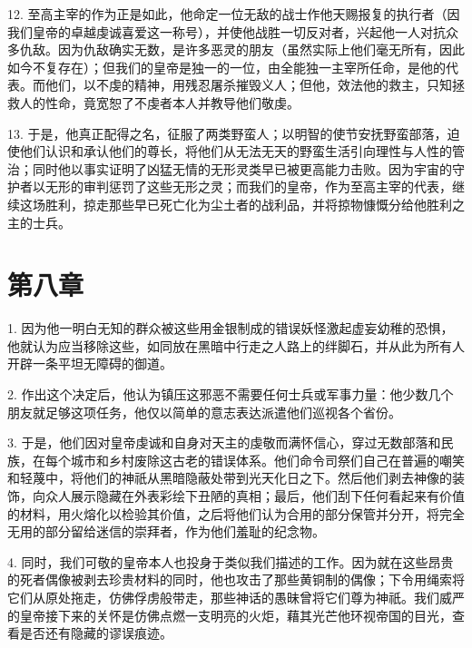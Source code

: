 12. 至高主宰的作为正是如此，他命定一位无敌的战士作他天赐报复的执行者（因我们皇帝的卓越虔诚喜爱这一称号），并使他战胜一切反对者，兴起他一人对抗众多仇敌。因为仇敌确实无数，是许多恶灵的朋友（虽然实际上他们毫无所有，因此如今不复存在）；但我们的皇帝是独一的一位，由全能独一主宰所任命，是他的代表。而他们，以不虔的精神，用残忍屠杀摧毁义人；但他，效法他的救主，只知拯救人的性命，竟宽恕了不虔者本人并教导他们敬虔。\par

13. 于是，他真正配得之名，征服了两类野蛮人；以明智的使节安抚野蛮部落，迫使他们认识和承认他们的尊长，将他们从无法无天的野蛮生活引向理性与人性的管治；同时他以事实证明了凶猛无情的无形灵类早已被更高能力击败。因为宇宙的守护者以无形的审判惩罚了这些无形之灵；而我们的皇帝，作为至高主宰的代表，继续这场胜利，掠走那些早已死亡化为尘土者的战利品，并将掠物慷慨分给他胜利之主的士兵。\par


\section{第八章}

1. 因为他一明白无知的群众被这些用金银制成的错误妖怪激起虚妄幼稚的恐惧，他就认为应当移除这些，如同放在黑暗中行走之人路上的绊脚石，并从此为所有人开辟一条平坦无障碍的御道。\par

2. 作出这个决定后，他认为镇压这邪恶不需要任何士兵或军事力量：他少数几个朋友就足够这项任务，他仅以简单的意志表达派遣他们巡视各个省份。\par

3. 于是，他们因对皇帝虔诚和自身对天主的虔敬而满怀信心，穿过无数部落和民族，在每个城市和乡村废除这古老的错误体系。他们命令司祭们自己在普遍的嘲笑和轻蔑中，将他们的神祇从黑暗隐蔽处带到光天化日之下。然后他们剥去神像的装饰，向众人展示隐藏在外表彩绘下丑陋的真相；最后，他们刮下任何看起来有价值的材料，用火熔化以检验其价值，之后将他们认为合用的部分保管并分开，将完全无用的部分留给迷信的崇拜者，作为他们羞耻的纪念物。\par

4. 同时，我们可敬的皇帝本人也投身于类似我们描述的工作。因为就在这些昂贵的死者偶像被剥去珍贵材料的同时，他也攻击了那些黄铜制的偶像；下令用绳索将它们从原处拖走，仿佛俘虏般带走，那些神话的愚昧曾将它们尊为神祇。我们威严的皇帝接下来的关怀是仿佛点燃一支明亮的火炬，藉其光芒他环视帝国的目光，查看是否还有隐藏的谬误痕迹。\par

